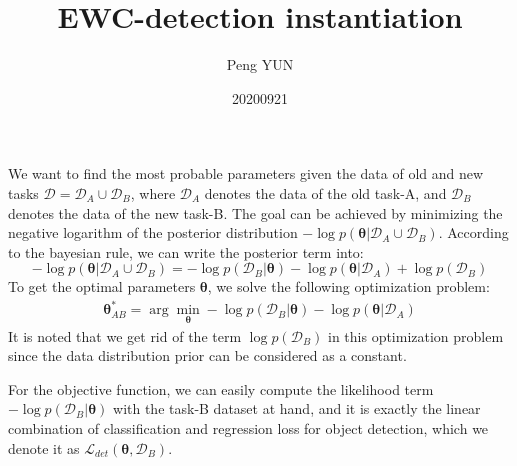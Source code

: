 \documentclass{article}
\title{EWC-detection instantiation}
\author{Peng YUN}
\date{20200921}
\begin{document}
\maketitle

We want to find the most probable parameters given the data of old and new tasks
$\mathcal D = \mathcal D_A \cup \mathcal D_B$,
where $\mathcal D_A$ denotes the data of the old task-A,
and $\mathcal D_B$ denotes the data of the new task-B.
The goal can be achieved by minimizing the negative logarithm of the posterior distribution
$-\log p(\boldsymbol{\theta} | \mathcal D_A \cup \mathcal D_B)$.
According to the bayesian rule, we can write the posterior term into:
\begin{equation}
-\log p(\boldsymbol{\theta} | \mathcal D_A \cup \mathcal D_B) = 
- \log p(\mathcal D_B | \boldsymbol{\theta})
- \log p(\boldsymbol{\theta} | \mathcal D_A)
+ \log p(\mathcal D_B)
\label{eq:posterior_two-task-case}
\end{equation}
To get the optimal parameters $\boldsymbol{\theta}$, we solve the following optimization problem:
\begin{equation}
\begin{split}
\boldsymbol{\theta}_{AB}^* = \arg \min_{\boldsymbol{\theta}} - \log p(\mathcal D_B | \boldsymbol{\theta})
- \log p(\boldsymbol{\theta} | \mathcal D_A) 
\end{split}
\end{equation}
It is noted that we get rid of the term $\log p(\mathcal D_B)$ in this optimization problem
since the data distribution prior can be considered as a constant.

For the objective function, we can easily compute the likelihood term $-\log p(\mathcal D_B |\boldsymbol{\theta})$
with the task-B dataset at hand,
and it is exactly the linear combination of classification and regression loss for object detection,
which we denote it as $\mathcal L_{det}(\boldsymbol{\theta}, \mathcal D_B)$.
\end{document}
